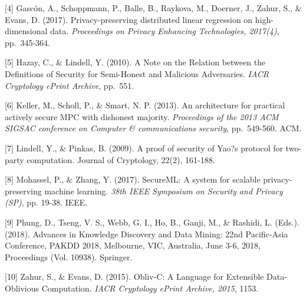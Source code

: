 \documentclass{article}
\begin{document}
[4] Gasc\'{o}n, A., Schoppmann, P., Balle, B., Raykova, M., Doerner, J., Zahur, S., \& Evans, D. (2017). Privacy-preserving distributed linear regression on high-dimensional data. {\it Proceedings on Privacy Enhancing Technologies, 2017(4)}, pp.\ 345-364.

[5] Hazay, C., \& Lindell, Y. (2010). A Note on the Relation between the Definitions of Security for Semi-Honest and Malicious Adversaries. {\it IACR Cryptology ePrint Archive}, pp.\ 551.

[6] Keller, M., Scholl, P., \& Smart, N. P. (2013). An architecture for practical actively secure MPC with dishonest majority. {\it Proceedings of the 2013 ACM SIGSAC conference on Computer \& communications security}, pp.\ 549-560. ACM.

[7] Lindell, Y., \& Pinkas, B. (2009). A proof of security of Yao?s protocol for two-party computation. Journal of Cryptology, 22(2), 161-188.

[8] Mohassel, P., \& Zhang, Y. (2017). SecureML: A system for scalable privacy-preserving machine learning. {\it 38th IEEE Symposium on Security and Privacy (SP)}, pp. 19-38. IEEE.

[9] Phung, D., Tseng, V. S., Webb, G. I., Ho, B., Ganji, M., \& Rashidi, L. (Eds.). (2018). Advances in Knowledge Discovery and Data Mining: 22nd Pacific-Asia Conference, PAKDD 2018, Melbourne, VIC, Australia, June 3-6, 2018, Proceedings (Vol. 10938). Springer.

[10] Zahur, S., \& Evans, D. (2015). Obliv-C: A Language for Extensible Data-Oblivious Computation. {\it IACR Cryptology ePrint Archive, 2015}, 1153.
\end{document}
